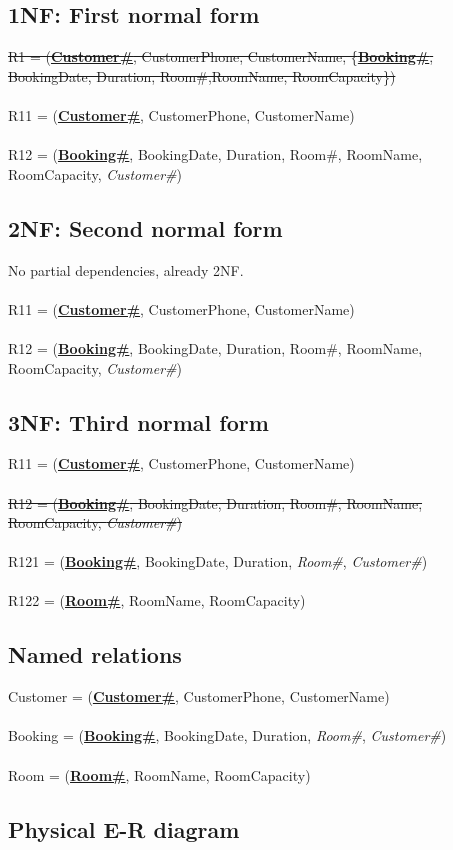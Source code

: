 \subsection{1NF: First normal form}

\sout{R1 = (\textbf{\underline{Customer\#}}, CustomerPhone, CustomerName, \{\textbf{\underline{Booking\#}}, BookingDate, Duration, Room\#,RoomName, RoomCapacity\})}
\\\\
R11 = (\textbf{\underline{Customer\#}}, CustomerPhone, CustomerName)
\\\\
R12 = (\textbf{\underline{Booking\#}}, BookingDate, Duration, Room\#, RoomName, RoomCapacity, \emph{Customer\#})

\subsection{2NF: Second normal form}

No partial dependencies, already 2NF.
\\\\
R11 = (\textbf{\underline{Customer\#}}, CustomerPhone, CustomerName)
\\\\
R12 = (\textbf{\underline{Booking\#}}, BookingDate, Duration, Room\#, RoomName, RoomCapacity, \emph{Customer\#})

\subsection{3NF: Third normal form}

R11 = (\textbf{\underline{Customer\#}}, CustomerPhone, CustomerName)
\\\\
\sout{R12 = (\textbf{\underline{Booking\#}}, BookingDate, Duration, Room\#, RoomName, RoomCapacity, \emph{Customer\#})}
\\\\
R121 = (\textbf{\underline{Booking\#}}, BookingDate, Duration, \emph{Room\#}, \emph{Customer\#})
\\\\
R122 = (\textbf{\underline{Room\#}}, RoomName, RoomCapacity)

\subsection{Named relations}

Customer = (\textbf{\underline{Customer\#}}, CustomerPhone, CustomerName)
\\\\
Booking = (\textbf{\underline{Booking\#}}, BookingDate, Duration, \emph{Room\#}, \emph{Customer\#})
\\\\
Room = (\textbf{\underline{Room\#}}, RoomName, RoomCapacity)

\subsection{Physical E-R diagram}